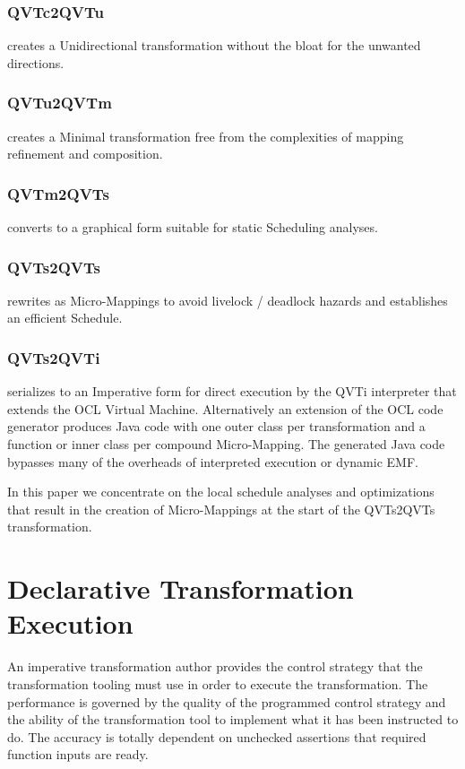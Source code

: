 \documentclass[conference]{IEEEtran}
\begin{document}
\subsubsection{QVTc2QVTu} creates a Unidirectional transformation without the bloat for the unwanted directions.

\subsubsection{QVTu2QVTm} creates a Minimal transformation free from the complexities of mapping refinement and composition.

\subsubsection{QVTm2QVTs} converts to a graphical form suitable for static Scheduling analyses.

\subsubsection{QVTs2QVTs} rewrites as Micro-Mappings to avoid livelock / deadlock hazards and establishes an efficient Schedule.

\subsubsection{QVTs2QVTi} serializes to an Imperative form for direct execution by the QVTi interpreter that extends the OCL Virtual Machine. Alternatively an extension of the OCL code generator produces Java code with one outer class per transformation and a function or inner class per compound Micro-Mapping. The generated Java code bypasses many of the overheads of interpreted execution or dynamic EMF.

In this paper we concentrate on the local schedule analyses and optimizations that result in the creation of Micro-Mappings at the start of the QVTs2QVTs transformation.

\section{Declarative Transformation Execution}\label{Declarative Transformation Execution}

An imperative transformation author provides the control strategy that the transformation tooling must use in order to execute the transformation. The performance is governed by the quality of the programmed control strategy and the ability of the transformation tool to implement what it has been instructed to do. The accuracy is totally dependent on unchecked assertions that required function inputs are ready.
\end{document}
